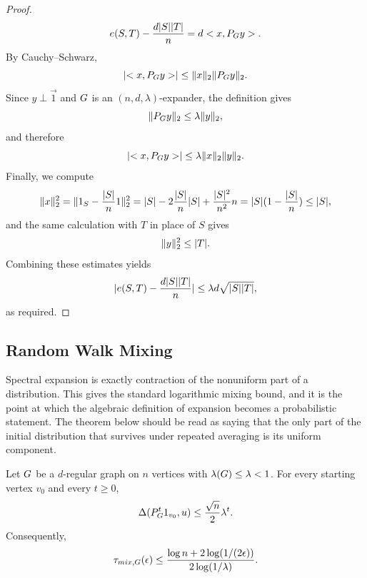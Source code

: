 \begin{proof}
\begin{equation}
		e(S,T)-\frac{d\lvert S\rvert\lvert T\rvert}{n}=d< x,P_{G}y>.
	\end{equation}
	By Cauchy--Schwarz,
	\begin{equation}
		\lvert< x,P_{G}y>\rvert\leq \lVert x\rVert_2\lVert P_{G}y\rVert_2.
	\end{equation}
	Since \(y\perp\vec{1}\) and \(G\) is an \((n,d,\lambda)\)-expander, the definition gives
	\begin{equation}
		\lVert P_{G}y\rVert_2\leq \lambda\lVert y\rVert_2,
	\end{equation}
	and therefore
	\begin{equation}
		\lvert< x,P_{G}y>\rvert\leq \lambda\lVert x\rVert_2\lVert y\rVert_2.
	\end{equation}
	Finally, we compute
	\begin{equation}
		\lVert x\rVert_2^2
		=
		\|1_S-\frac{\lvert S\rvert}{n}1\|_2^2
		=
		\lvert S\rvert-2\frac{\lvert S\rvert}{n}\lvert S\rvert+\frac{\lvert S\rvert^2}{n^2}n
		=
		\lvert S\rvert(1-\frac{\lvert S\rvert}{n})
		\leq \lvert S\rvert,
	\end{equation}
	and the same calculation with \(T\) in place of \(S\) gives
	\begin{equation}
		\lVert y\rVert_2^2\leq \lvert T\rvert.
	\end{equation}
	Combining these estimates yields
	\begin{equation}
		\lvert e(S,T)-\frac{d\lvert S\rvert\lvert T\rvert}{n}\rvert\leq \lambda d\sqrt{\lvert S\rvert\lvert T\rvert},
	\end{equation}
	as required.
\end{proof}

\subsection{Random Walk Mixing}
\label{subsec:random-walk-mixing}

Spectral expansion is exactly contraction of the nonuniform part of a distribution. This gives the standard logarithmic mixing bound, and it is the point at which the algebraic definition of expansion becomes a probabilistic statement. The theorem below should be read as saying that the only part of the initial distribution that survives under repeated averaging is its uniform component.

\begin{theorem}
	\label{thm:spectral-mixing}
	Let \(G\) be a \(d\)-regular graph on \(n\) vertices with \(\lambda(G)\leq\lambda<1\). For every starting vertex \(v_0\) and every \(t\geq 0\),
	\begin{equation}
		\Delta(P_{G}^t1_{v_0},u)\leq \frac{\sqrt{n}}{2}\lambda^t.
	\end{equation}
	Consequently,
	\begin{equation}
		\tau_{mix,G}(\epsilon)\leq \frac{\operatorname*{log} n+2\operatorname*{log}(1/(2\epsilon))}{2\operatorname*{log}(1/\lambda)}.
	\end{equation}
\end{theorem}

